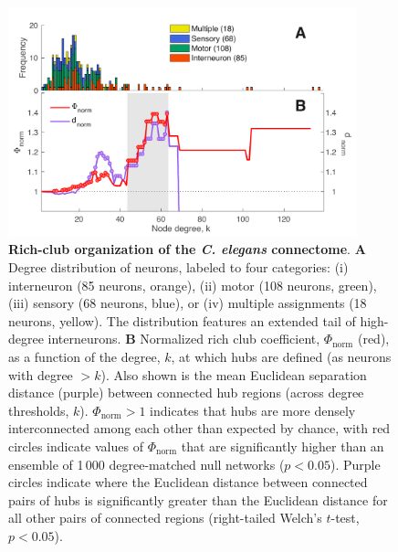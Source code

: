 \documentclass[10pt,letterpaper]{article}
\begin{document}


\begin{figure}[h]
   \centering
    \includegraphics[width=0.9\textwidth]{topologicalRCall2.pdf}
 \caption{\textbf{Rich-club organization of the \emph{C. elegans} connectome}.
\textbf{A} Degree distribution of neurons, labeled to four categories:
(i) interneuron (85 neurons, orange),
(ii) motor (108 neurons, green),
(iii) sensory (68 neurons, blue), or
(iv) multiple assignments (18 neurons, yellow).
The distribution features an extended tail of high-degree interneurons.
\textbf{B}
Normalized rich club coefficient, $\Phi_\mathrm{norm}$ (red), as a function of the degree, $k$, at which hubs are defined (as neurons with degree $>k$).
Also shown is the mean Euclidean separation distance (purple) between connected hub regions (across degree thresholds, $k$).
$\Phi_\mathrm{norm} > 1$ indicates that hubs are more densely interconnected among each other than expected by chance, with red circles indicate values of $\Phi_\mathrm{norm}$ that are significantly higher than an ensemble of 1\,000 degree-matched null networks ($p < 0.05$).
Purple circles indicate where the Euclidean distance between connected pairs of hubs is significantly greater than the Euclidean distance for all other pairs of connected regions (right-tailed Welch's $t$-test, $p < 0.05$).
}
 \label{fig:topology_rich}
 \end{figure}
\end{document}

